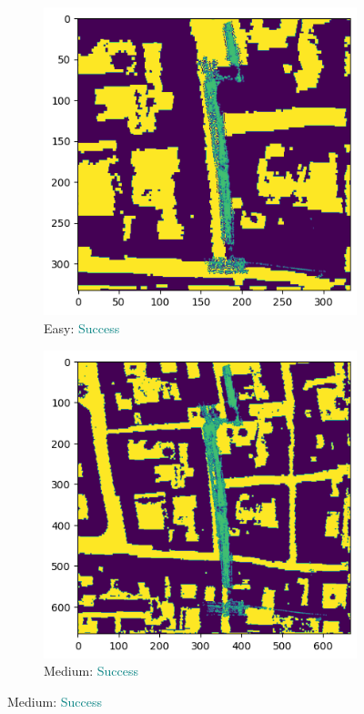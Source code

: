 \documentclass[11pt]{article}
\begin{document}
    \newpage
    \begin{figure}[p]
        \centering
        \begin{subfigure}{0.45\textwidth}
            \centering
            \includegraphics[width=\linewidth]{images/full/easy/5_1_2_easy}
            \caption{Easy: \textcolor{teal}{Success}}
            \label{fig:5_1_2_easy}
        \end{subfigure}
        \hfill
        \begin{subfigure}{0.45\textwidth}
            \centering
            \includegraphics[width=\linewidth]{images/full/medium/5_1_2_medium}
            \caption{Medium: \textcolor{teal}{Success}}
            \label{fig:5_1_2_medium}
        \end{subfigure}


\end{figure}
\end{document}
